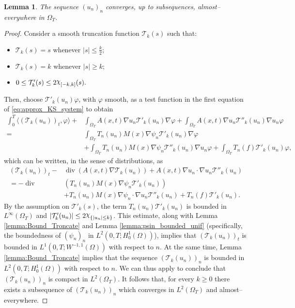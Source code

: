 \documentclass{amsart}
\numberwithin{equation}{section}
\newtheorem{lemma}[example]{Lemma}
\def\elle#1{L^{#1}}
\def\elleomT#1{L^{#1}(\Omega_T)}
\def\Hom{H^1_0(\Omega)}
\def\ioT{\int_{\Omega_T}}
\newcommand{\abs}[1]{\left|#1\right|}
\DeclareRobustCommand{\rchi}{{\mathpalette\irchi\relax}}
\newcommand{\irchi}[2]{\raisebox{\depth}{$#1\chi$}} %
\begin{document}
\begin{lemma}\label{lemma:ae_convergence_un}
    The sequence $(u_n)_n$ converges, up to subsequences, almost--everywhere in $\Omega_T$.
\end{lemma}
\begin{proof}
    Consider a smooth truncation function $\mathcal{T}_k(s)$ such that:
    \begin{itemize}
        \item $\mathcal T_k(s)=s$ whenever $\abs{s}\leq \frac{k}{2}$;
        \item $\mathcal T_k(s)=k$ whenever $\abs{s}\geq k$;
        \item $0\leq \mathcal{T}_k'(s)\leq 2\rchi_{[-k,k]}(s).$
    \end{itemize}
    Then, choose $\mathcal{T}'_k(u_n)\varphi$, with $\varphi$ smooth, as a test function in the first equation of \eqref{eq:approx_KS_system} to obtain
    \begin{equation}
        \begin{split}   
            \int_0^T\langle (\mathcal{T}_k(u_n))_t,\varphi\rangle +& \ioT A(x,t)\nabla u_n \mathcal{T}'_k(u_n)\nabla \varphi +\ioT A(x,t)\nabla u_n \mathcal{T}''_k(u_n)\nabla u_n \varphi\\
            = &\ioT T_n(u_n) M(x)\nabla\psi_n \mathcal{T}'_k(u_n)\nabla \varphi \\&+ \ioT T_n(u_n) M(x)\nabla\psi_n \mathcal{T}''_k(u_n)\nabla u_n \varphi + \ioT T_n(f)\mathcal{T}'_k(u_n)\varphi,
        \end{split}
    \end{equation}
    which can be written, in the sense of distributions, as
    \begin{equation}
        \begin{split}
            (\mathcal{T}_k(u_n))_t -&\operatorname{div}( A(x,t)\nabla\mathcal{T}_k(u_n))+A(x,t)\nabla u_n\cdot \nabla u_n \mathcal{T}''_k(u_n) \\=
            -\operatorname{div}&(T_n(u_n) M(x)\nabla\psi_n \mathcal{T}'_k(u_n))\\&+ T_n(u_n) M(x)\nabla\psi_n \cdot \nabla u_n  \mathcal{T}''_k(u_n) + T_n(f)\mathcal{T}'_k(u_n).
        \end{split}
    \end{equation}
    By the assumption on $\mathcal{T}'_k(s)$, the term $T_n(u_n)\mathcal{T}'_k(u_n)$ is bounded in $\elleomT\infty$ and $\abs{\mathcal{T}'_k(u_n)}\leq2\rchi_{\{\abs{u_n}\leq k\}}$. This estimate, along with Lemma \ref{lemma:Bound_Troncate} and Lemma \ref{lemma:psin_bounded_unif} (specifically, the boundedness of $(\psi_n)_n$ in $\elle2(0,T;\Hom)$), implies that $(\mathcal{T}_k(u_n))_t$ is bounded in $\elle1(0,T;W^{-1,1}(\Omega))$ with respect to $n$. At the same time, Lemma \ref{lemma:Bound_Troncate} implies that the sequence $(\mathcal{T}_k(u_n))_n$ is bounded in $\elle2(0,T;\Hom)$ with respect to $n$. We can thus apply \cite[Corollary 4]{Simon} to conclude that $(\mathcal{T}_k(u_n))_n$ is compact in $\elleomT2$.
    It follows that, for every $k\geq0$ there exists a subsequence of $(\mathcal{T}_k(u_n))_n$ which converges in $\elleomT2$ and almost--everywhere.


\end{proof}
\end{document}
